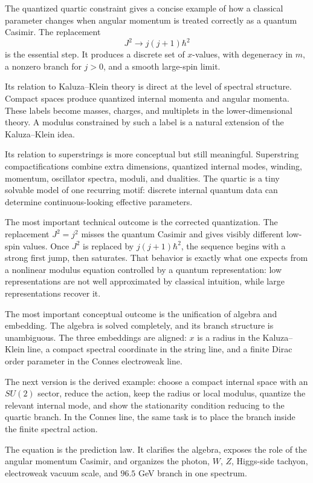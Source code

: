 \documentclass[11pt]{article}
\newcommand{\hb}{\hbar}
\begin{document}
The quantized quartic constraint gives a concise example of how a classical parameter changes when angular momentum is treated correctly as a quantum Casimir. The replacement
\[
        J^2\to j(j+1)\hb^2
\]
is the essential step. It produces a discrete set of \(x\)-values, with degeneracy in \(m\), a nonzero branch for \(j>0\), and a smooth large-spin limit.

Its relation to Kaluza--Klein theory is direct at the level of spectral structure. Compact spaces produce quantized internal momenta and angular momenta. These labels become masses, charges, and multiplets in the lower-dimensional theory. A modulus constrained by such a label is a natural extension of the Kaluza--Klein idea.

Its relation to superstrings is more conceptual but still meaningful. Superstring compactifications combine extra dimensions, quantized internal modes, winding, momentum, oscillator spectra, moduli, and dualities. The quartic is a tiny solvable model of one recurring motif: discrete internal quantum data can determine continuous-looking effective parameters.

The most important technical outcome is the corrected quantization. The replacement \(J^2=j^2\) misses the quantum Casimir and gives visibly different low-spin values. Once \(J^2\) is replaced by \(j(j+1)\hb^2\), the sequence begins with a strong first jump, then saturates. That behavior is exactly what one expects from a nonlinear modulus equation controlled by a quantum representation: low representations are not well approximated by classical intuition, while large representations recover it.

The most important conceptual outcome is the unification of algebra and embedding. The algebra is solved completely, and its branch structure is unambiguous. The three embeddings are aligned: \(x\) is a radius in the Kaluza--Klein line, a compact spectral coordinate in the string line, and a finite Dirac order parameter in the Connes electroweak line.

The next version is the derived example: choose a compact internal space with an \(SU(2)\) sector, reduce the action, keep the radius or local modulus, quantize the relevant internal mode, and show the stationarity condition reducing to the quartic branch. In the Connes line, the same task is to place the branch inside the finite spectral action.

The equation is the prediction law. It clarifies the algebra, exposes the role of the angular momentum Casimir, and organizes the photon, \(W\), \(Z\), Higgs-side tachyon, electroweak vacuum scale, and \(96.5\) GeV branch in one spectrum.
\end{document}
